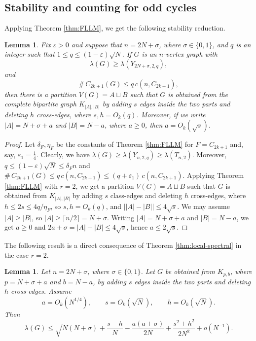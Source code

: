 \documentclass[11pt,a4paper]{article}
\newtheorem{lemma}[theorem]{Lemma}
\theoremstyle{definition}
\theoremstyle{plain}
\newcommand{\eps}{\varepsilon}
\renewcommand{\le}{\leqslant}
\renewcommand{\ge}{\geqslant}
\begin{document}
\subsection{Stability and counting for odd cycles}

Applying Theorem \ref{thm:FLLM}, 
we get the following stability reduction.

\begin{lemma} \label{lem-stability-odd}
Fix $\eps>0$ and suppose that 
$ n=2N+\sigma$, where $\sigma\in\{0,1\}$,  
and $q$ is an integer such that $   1\le q\le (1-\eps)\sqrt N$. If $G$ is an $n$-vertex graph with 
\[
        \lambda(G)\ge \lambda(Y_{2N+\sigma,2,q}),
\]
and 
\[
       \texttt{\#}\,{C_{2k+1}}(G)\le q\,c(n,C_{2k+1}),
\]
then 
there is a partition $ V(G)=A\sqcup B$
such that $G$ is obtained from the complete bipartite graph $K_{|A|,|B|}$ by adding $s$ edges inside the two parts and deleting $h$ cross-edges, where 
$ s,h=O_k(q)$. Moreover, if we write $ |A|=N+\sigma+a$ and $ |B|=N-a$, where $a \ge 0$, then $a=O_k(\sqrt{s})$. 
\end{lemma}


\begin{proof}
Let $\delta_F,\eta_F$ be the constants of Theorem
\ref{thm:FLLM} for $F=C_{2k+1}$ and, say,
$\varepsilon_1=\tfrac14$. 
Clearly, we have $\lambda(G)\ge \lambda (Y_{n,2,q}) \ge  \lambda(T_{n,2})$. Moreover,
$q\le(1-\eps)\sqrt N\le\delta_F n$ and
$\texttt{\#}\,C_{2k+1}(G)\le q\,c(n,C_{2k+1})
\le(q+\varepsilon_1)\,c(n,C_{2k+1})$.
Applying Theorem \ref{thm:FLLM} with $r=2$, we get a
partition $V(G)=A\sqcup B$ such that $G$ is obtained
from $K_{|A|,|B|}$ by adding $s$ class-edges and
deleting $h$ cross-edges, where
$h\le 2s\le 4q/\eta_F$, so $s,h=O_k(q)$, and
$\bigl||A|-|B|\bigr|\le 4\sqrt s$. We may assume
$|A|\ge|B|$, so $|A|\ge\lceil n/2\rceil=N+\sigma$.
Writing $|A|=N+\sigma+a$ and $|B|=N-a$, we get
$a\ge0$ and $2a+\sigma=|A|-|B|\le 4\sqrt s$, hence
$a\le 2\sqrt s$.
\end{proof}



The following result is a direct consequence of Theorem \ref{thm:local-spectral} in the case $r=2$. 

\begin{lemma}\label{lem:local-spectrum-odd}
Let $n=2N+\sigma$, where $\sigma\in\{0,1\}$.  Let $G$ be obtained from $ K_{p,b}$, where 
$p=N+\sigma+a$ and $ b=N-a$, 
by adding $s$ edges inside the two parts and deleting $h$ cross-edges.  Assume
\[
        a=O_k(N^{1/4}),
        \qquad
        s=O_k(\sqrt N),
        \qquad
        h=O_k(\sqrt N).
\]
Then
\[
        \lambda(G)
        \le
        \sqrt{N(N+\sigma)}
        +\frac{s-h}{N}
        -\frac{a(a+\sigma)}{2N}
        +\frac{s^2+h^2}{2N^2}
        +o(N^{-1}).
\]
\end{lemma}
\end{document}
